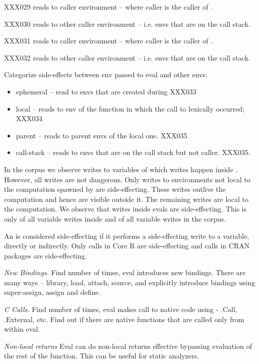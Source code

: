\documentclass[USenglish,cleveref, autoref, thm-restate]{lipics-v2019}
\newcommand{\mypara}[1]{\medskip\noindent\emph{#1}\xspace}
\begin{document}
XXX029 reads to caller environment -- where caller is the caller of
\eval.

XXX030 reads to other caller environment -- i.e. envs that are on the
call stack.

XXX031 reads to caller environment -- where caller is the caller of
\eval.

XXX032 reads to other caller environment -- i.e. envs that are on the
call stack.

Categorize side-effects between env passed to eval and other envs:
\begin{itemize}
\item ephemeral -- read to envs that are created during \eval  XXX033
\item local -- reads to env of the function in which the call to \eval
  lexically occurred; XXX034
\item parent -- reads to parent envs of the local one. XXX035
\item call-stack -- reads to envs that are on the call stack but not
  caller. XXX035.
\end{itemize}

In the corpus we observe \AllWritesRnd writes to variables of which
\EvalWritesRnd writes happen inside \eval. However, all writes are not
dangerous. Only writes to environments not local to the computation
spawned by \eval are side-effecting. These writes outlive the
computation and hence are visible outside it. The remaining writes are
local to the computation. We observe that \EvalSideEffectingWritesRnd
writes inside evals are side-effecting. This is only
\EvalSideEffectingWritesEvalPerc of all variable writes inside \eval
and \EvalSideEffectingWritesAllPerc of all variable writes in the
corpus.

An \eval is considered side-effecting if it performs a side-effecting
write to a variable, directly or indirectly. Only
\SideEffectingCoreCallPerc \eval calls in Core R are side-effecting
and \SideEffectingPackageCallPerc \eval calls in CRAN packages are
side-effecting.


\mypara{New Bindings.} Find number of times, eval introduces new
bindings. There are many ways -- library, load, attach, source, and
explicitly introduce bindings using super-assign, assign and define.

\mypara{C Calls.} Find number of times, eval makes call to native code
using - .Call, .External, etc. Find out if there are native functions
that are called only from within eval.

\mypara{Non-local returns}
Eval can do non-local returns effective bypassing evaluation of the
rest of the function. This can be useful for static analyzers.
\end{document}
